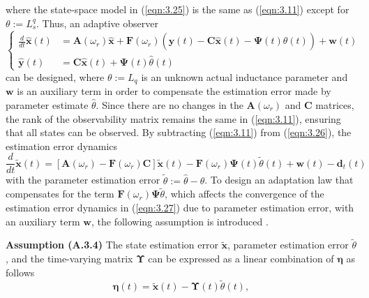 where the state-space model in (\ref{eqn:3.25}) is the same as (\ref{eqn:3.11}) except for \(\theta := L^q_s\). Thus, an adaptive observer 
\begin{equation}\label{eqn:3.26}
\left\{
\begin{aligned}
    \frac{d}{dt} \hat{\mathbf{x}}(t) &= \mathbf{A}(\omega_r) \hat{\mathbf{x}} + \mathbf{F}(\omega_r) \left( \mathbf{y}(t) - \mathbf{C} \hat{\mathbf{x}}(t) - \mathbf{\Psi}(t) \hat\theta(t) \right) + \mathbf{w}(t) \\
    \hat{\mathbf{y}}(t) &= \mathbf{C} \hat{\mathbf{x}}(t) + \mathbf{\Psi}(t) \hat{\theta}(t)
\end{aligned}
\right.
\end{equation}
can be designed, where \(\theta := L_q\) is an unknown actual inductance parameter and \(\mathbf{w}\) is an auxiliary term in order to compensate the estimation error made by parameter estimate $\hat\theta$. Since there are no changes in the \( \mathbf{A}(\omega_r) \) and \( \mathbf{C} \) matrices, the rank of the observability matrix remains the same in (\ref{eqn:3.11}), ensuring that all states can be observed. By subtracting (\ref{eqn:3.11}) from  (\ref{eqn:3.26}), the estimation error dynamics
\begin{equation}\label{eqn:3.27}
\frac{d}{dt} \tilde{\mathbf{x}}(t) = \left[ \mathbf{A}(\omega_r) - \mathbf{F}(\omega_r)\mathbf{C} \right] \tilde{\mathbf{x}}(t) - \mathbf{F}(\omega_r)\mathbf{\Psi}(t) \tilde\theta(t) + \mathbf{w}(t) - {\mathbf{d}_{t}}(t)
\end{equation}
with the parameter estimation error \(\tilde{\theta} := \hat{\theta} - \theta\). To design an adaptation law that compensates for the term \(\mathbf{F}(\omega_r)\mathbf{\Psi}\tilde\theta\), which affects the convergence of the estimation error dynamics in (\ref{eqn:3.27}) due to parameter estimation error, with an auxiliary term \(\mathbf{w}\), the following assumption is introduced \cite{c3.2_5}.

\textbf{Assumption (A.3.4)} The state estimation error \(\tilde{\mathbf{x}}\), parameter estimation error \(\tilde{\theta}\), and the time-varying matrix \(\boldsymbol{\Upsilon}\) can be expressed as a linear combination of \(\boldsymbol{\eta}\) \cite{c3.2_6} as follows
\begin{equation}\label{eqn:3.28}
\boldsymbol{\eta}(t) = \tilde{\mathbf{x}}(t) - \boldsymbol{\Upsilon}(t) \tilde{\theta}(t),
\end{equation}

